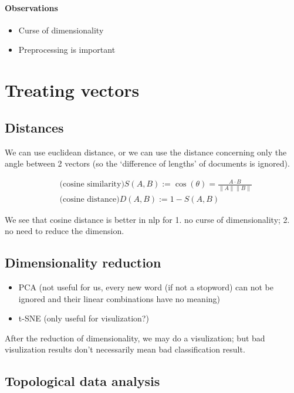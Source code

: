 \documentclass{article}
\begin{document}
\paragraph{Observations}
\begin{itemize}
  \item Curse of dimensionality
  \item Preprocessing is important
\end{itemize}

\section{Treating vectors}

\subsection{Distances}

We can use euclidean distance, or we can use the distance concerning
only the angle between 2 vectors (so the `difference of lengths' of documents
is ignored).

$$
\begin{aligned}
&\text{(cosine similarity)}S(A, B) :=
\cos (\theta)=\frac{A \cdot B}{\|A\|\|B\|}\\
&\text{(cosine distance)}D(A, B) :=1-S(A, B)
\end{aligned}
$$

We see that cosine distance is better in nlp for 1. no curse of dimensionality; 2. no
need to reduce the dimension.

\subsection{Dimensionality reduction}

\begin{itemize}
  \item PCA (not useful for us, every new word (if not a stopword) can not be ignored and their linear combinations have no meaning)
  \item t-SNE (only useful for visulization?)
\end{itemize}

After the reduction of dimensionality, we may do a visulization; but
bad visulization results don't necessarily mean bad classification result.

\subsection{Topological data analysis}
\end{document}
